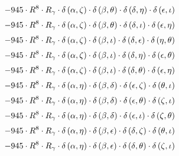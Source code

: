 \begin{subequations}
\begin{gather}
 \\[0.2em] \notag 		 - 945 \cdot R^{8} \cdot R_{\gamma{}} \cdot \delta{}\left(\alpha{}, \zeta{}\right) \cdot \delta{}\left(\beta{}, \theta{}\right) \cdot \delta{}\left(\delta{}, \eta{}\right) \cdot \delta{}\left(\epsilon{}, \iota{}\right) 
 \\[0.2em] \notag 		 - 945 \cdot R^{8} \cdot R_{\gamma{}} \cdot \delta{}\left(\alpha{}, \zeta{}\right) \cdot \delta{}\left(\beta{}, \theta{}\right) \cdot \delta{}\left(\delta{}, \iota{}\right) \cdot \delta{}\left(\epsilon{}, \eta{}\right) 
 \\[0.2em] \notag 		 - 945 \cdot R^{8} \cdot R_{\gamma{}} \cdot \delta{}\left(\alpha{}, \zeta{}\right) \cdot \delta{}\left(\beta{}, \iota{}\right) \cdot \delta{}\left(\delta{}, \epsilon{}\right) \cdot \delta{}\left(\eta{}, \theta{}\right) 
 \\[0.2em] \notag 		 - 945 \cdot R^{8} \cdot R_{\gamma{}} \cdot \delta{}\left(\alpha{}, \zeta{}\right) \cdot \delta{}\left(\beta{}, \iota{}\right) \cdot \delta{}\left(\delta{}, \eta{}\right) \cdot \delta{}\left(\epsilon{}, \theta{}\right) 
 \\[0.2em] \notag 		 - 945 \cdot R^{8} \cdot R_{\gamma{}} \cdot \delta{}\left(\alpha{}, \zeta{}\right) \cdot \delta{}\left(\beta{}, \iota{}\right) \cdot \delta{}\left(\delta{}, \theta{}\right) \cdot \delta{}\left(\epsilon{}, \eta{}\right) 
 \\[0.2em] \notag 		 - 945 \cdot R^{8} \cdot R_{\gamma{}} \cdot \delta{}\left(\alpha{}, \eta{}\right) \cdot \delta{}\left(\beta{}, \delta{}\right) \cdot \delta{}\left(\epsilon{}, \zeta{}\right) \cdot \delta{}\left(\theta{}, \iota{}\right) 
 \\[0.2em] \notag 		 - 945 \cdot R^{8} \cdot R_{\gamma{}} \cdot \delta{}\left(\alpha{}, \eta{}\right) \cdot \delta{}\left(\beta{}, \delta{}\right) \cdot \delta{}\left(\epsilon{}, \theta{}\right) \cdot \delta{}\left(\zeta{}, \iota{}\right) 
 \\[0.2em] \notag 		 - 945 \cdot R^{8} \cdot R_{\gamma{}} \cdot \delta{}\left(\alpha{}, \eta{}\right) \cdot \delta{}\left(\beta{}, \delta{}\right) \cdot \delta{}\left(\epsilon{}, \iota{}\right) \cdot \delta{}\left(\zeta{}, \theta{}\right) 
 \\[0.2em] \notag 		 - 945 \cdot R^{8} \cdot R_{\gamma{}} \cdot \delta{}\left(\alpha{}, \eta{}\right) \cdot \delta{}\left(\beta{}, \epsilon{}\right) \cdot \delta{}\left(\delta{}, \zeta{}\right) \cdot \delta{}\left(\theta{}, \iota{}\right) 
 \\[0.2em] \notag 		 - 945 \cdot R^{8} \cdot R_{\gamma{}} \cdot \delta{}\left(\alpha{}, \eta{}\right) \cdot \delta{}\left(\beta{}, \epsilon{}\right) \cdot \delta{}\left(\delta{}, \theta{}\right) \cdot \delta{}\left(\zeta{}, \iota{}\right) 

\end{gather}
\end{subequations}
